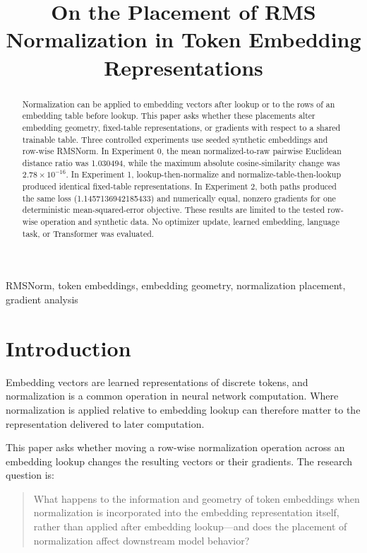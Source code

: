 \documentclass[conference]{IEEEtran}
\title{On the Placement of RMS Normalization in Token Embedding Representations}
\author{
\IEEEauthorblockN{Balivada Tarun Sandilya}
\IEEEauthorblockA{AI/ML Engineering Research\\
India}
}
\begin{document}
\maketitle

\begin{abstract}
Normalization can be applied to embedding vectors after lookup or to the rows of an embedding table before lookup. This paper asks whether these placements alter embedding geometry, fixed-table representations, or gradients with respect to a shared trainable table. Three controlled experiments use seeded synthetic embeddings and row-wise RMSNorm. In Experiment 0, the mean normalized-to-raw pairwise Euclidean distance ratio was 1.030494, while the maximum absolute cosine-similarity change was \(2.78\times10^{-16}\). In Experiment 1, lookup-then-normalize and normalize-table-then-lookup produced identical fixed-table representations. In Experiment 2, both paths produced the same loss (1.1457136942185433) and numerically equal, nonzero gradients for one deterministic mean-squared-error objective. These results are limited to the tested row-wise operation and synthetic data. No optimizer update, learned embedding, language task, or Transformer was evaluated.
\end{abstract}

\begin{IEEEkeywords}
RMSNorm, token embeddings, embedding geometry, normalization placement, gradient analysis
\end{IEEEkeywords}

\section{Introduction}
Embedding vectors are learned representations of discrete tokens, and normalization is a common operation in neural network computation. Where normalization is applied relative to embedding lookup can therefore matter to the representation delivered to later computation.

This paper asks whether moving a row-wise normalization operation across an embedding lookup changes the resulting vectors or their gradients. The research question is:
\begin{quote}
What happens to the information and geometry of token embeddings when normalization is incorporated into the embedding representation itself, rather than applied after embedding lookup---and does the placement of normalization affect downstream model behavior?
\end{quote}
\end{document}
